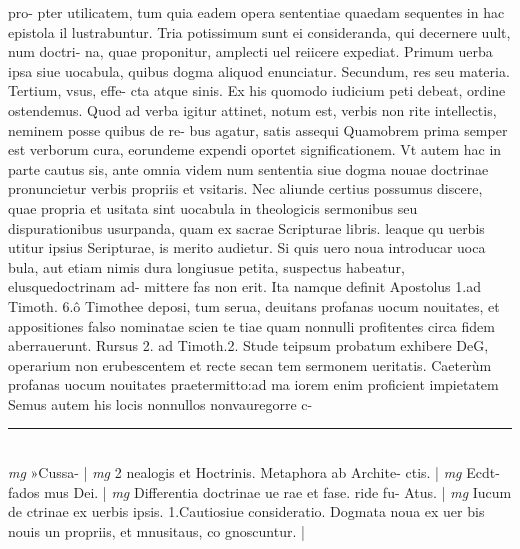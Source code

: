 \documentclass{article}
\begin{document}
\begin{pages}
pro- pter utilicatem, tum quia eadem opera sententiae quaedam sequentes in hac epistola il lustrabuntur. Tria potissimum sunt ei consideranda, qui decernere uult, num doctri- na, quae proponitur, amplecti uel reiicere expediat. Primum uerba ipsa siue uocabula, quibus dogma aliquod enunciatur. Secundum, res seu materia. Tertium, vsus, effe- cta atque  sinis. Ex his quomodo iudicium peti debeat, ordine ostendemus. Quod ad verba igitur attinet, notum est, verbis non rite intellectis, neminem posse quibus de re- bus agatur, satis assequi Quamobrem prima semper est verborum cura, eorundeme expendi oportet significationem. Vt autem hac in parte cautus sis, ante omnia videm num sententia siue dogma nouae doctrinae pronuncietur verbis propriis et vsitaris. Nec aliunde certius possumus discere, quae propria et usitata sint uocabula in theologicis sermonibus seu dispurationibus usurpanda, quam ex sacrae Scripturae libris. leaque  qu uerbis utitur ipsius Seripturae, is merito audietur. Si quis uero noua introducar uoca bula, aut etiam nimis dura longiusue petita, suspectus habeatur, elusquedoctrinam ad- mittere fas non erit. Ita namque  definit Apostolus 1.ad Timoth. 6.ô Timothee deposi, tum serua, deuitans profanas uocum nouitates, et appositiones falso nominatae scien te tiae quam nonnulli profitentes circa fidem aberrauerunt. Rursus 2. ad Timoth.2.  Stude teipsum probatum exhibere DeG, operarium non erubescentem et recte secan   tem sermonem ueritatis. Caeterùm profanas uocum nouitates praetermitto:ad ma   iorem enim proficient impietatem Semus autem his locis nonnullos nonvauregorre c-  \pend
\vspace{0.5cm}\noindent
\vspace{0.2cm}\rule{1cm}{0.2pt}\\ 
\hspace{0.2cm}\textit{mg}
\footnotesize »Cussa- 
\normalsize| 
\hspace{0.2cm}\textit{mg}
\footnotesize  2  nealogis et Hoctrinis. Metaphora ab Archite- ctis. 
\normalsize| 
\hspace{0.2cm}\textit{mg}
\footnotesize Ecdt-fados mus Dei. 
\normalsize| 
\hspace{0.2cm}\textit{mg}
\footnotesize Differentia doctrinae ue rae et fase. ride fu- Atus. 
\normalsize| 
\hspace{0.2cm}\textit{mg}
\footnotesize Iucum de ctrinae ex uerbis ipsis. 1.Cautiosiue consideratio. Dogmata noua ex uer bis nouis un propriis, et mnusitaus, co gnoscuntur. 
\normalsize| 

\end{pages}
\end{document}
